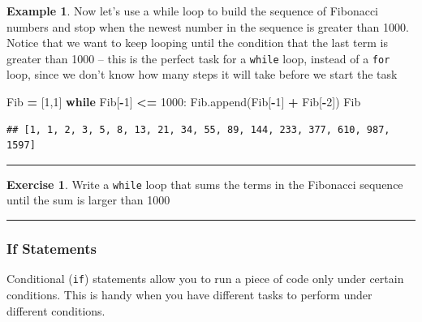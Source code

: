 \documentclass[
]{book}
\newenvironment{Shaded}{\begin{snugshade}}{\end{snugshade}}
\newcommand{\ControlFlowTok}[1]{\textcolor[rgb]{0.13,0.29,0.53}{\textbf{#1}}}
\newcommand{\DecValTok}[1]{\textcolor[rgb]{0.00,0.00,0.81}{#1}}
\newcommand{\NormalTok}[1]{#1}
\newcommand{\OperatorTok}[1]{\textcolor[rgb]{0.81,0.36,0.00}{\textbf{#1}}}
\theoremstyle{definition}
\theoremstyle{definition}
\newtheorem{example}{Example}[chapter]
\theoremstyle{definition}
\newtheorem{exercise}{Exercise}[chapter]
\theoremstyle{remark}
\begin{document}
\begin{example}
\protect\hypertarget{exm:unnamed-chunk-669}{}{\label{exm:unnamed-chunk-669} }Now let's use a while loop to build the sequence of Fibonacci numbers and stop when the newest number in the sequence is greater than 1000. Notice that we want to keep looping until the condition that the last term is greater than 1000 -- this is the perfect task for a \texttt{while} loop, instead of a \texttt{for} loop, since we don't know how many steps it will take before we start the task
\end{example}

\begin{Shaded}
\begin{Highlighting}[]
\NormalTok{Fib }\OperatorTok{=}\NormalTok{ [}\DecValTok{1}\NormalTok{,}\DecValTok{1}\NormalTok{]}
\ControlFlowTok{while}\NormalTok{ Fib[}\OperatorTok{{-}}\DecValTok{1}\NormalTok{] }\OperatorTok{\textless{}=} \DecValTok{1000}\NormalTok{:}
\NormalTok{    Fib.append(Fib[}\OperatorTok{{-}}\DecValTok{1}\NormalTok{] }\OperatorTok{+}\NormalTok{ Fib[}\OperatorTok{{-}}\DecValTok{2}\NormalTok{])}
\NormalTok{Fib}
\end{Highlighting}
\end{Shaded}

\begin{verbatim}
## [1, 1, 2, 3, 5, 8, 13, 21, 34, 55, 89, 144, 233, 377, 610, 987, 1597]
\end{verbatim}

\begin{center}\rule{0.5\linewidth}{0.5pt}\end{center}

\begin{exercise}
\protect\hypertarget{exr:unnamed-chunk-671}{}{\label{exr:unnamed-chunk-671} }Write a \texttt{while} loop that sums the terms in the Fibonacci sequence until
the sum is larger than 1000
\end{exercise}

\begin{center}\rule{0.5\linewidth}{0.5pt}\end{center}

\hypertarget{if-statements}{%
\subsubsection{If Statements}\label{if-statements}}

Conditional (\texttt{if}) statements allow you to run a piece of code only under certain conditions. This is handy when you have different tasks to perform under different conditions.
\end{document}
